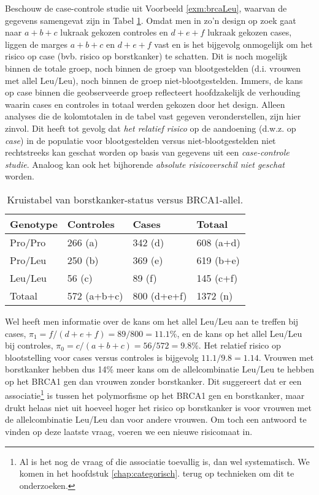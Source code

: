 \documentclass[
  12pt,dutch,coursenotes]{book}
\theoremstyle{definition}
\theoremstyle{definition}
\theoremstyle{definition}
\theoremstyle{remark}
\begin{document}
Beschouw de case-controle studie uit Voorbeeld \ref{exm:brcaLeu}, waarvan
de gegevens samengevat zijn in Tabel \ref{tab:leu2}. Omdat men in
zo'n design op zoek gaat naar \(a+b+c\) lukraak gekozen controles en \(d+e+f\) lukraak
gekozen cases, liggen de marges \(a+b+c\) en \(d+e+f\) vast en is het bijgevolg
onmogelijk om het risico op case (bvb. risico op borstkanker) te schatten. Dit is noch mogelijk binnen de
totale groep, noch binnen de groep van blootgestelden (d.i. vrouwen met allel Leu/Leu), noch binnen de groep
niet-blootgestelden. Immers, de kans op case binnen die geobserveerde groep reflecteert hoofdzakelijk de verhouding waarin cases en controles in totaal werden gekozen door het design. Alleen analyses die de kolomtotalen
in de tabel vast gegeven veronderstellen, zijn hier zinvol. Dit heeft tot
gevolg dat \emph{het relatief risico} op de aandoening (d.w.z. op \emph{case})
in de populatie voor blootgestelden versus niet-blootgestelden niet
rechtstreeks kan geschat worden op basis van gegevens uit een \emph{case-controle studie}. Analoog kan ook het bijhorende \emph{absolute risicoverschil niet geschat} worden.

\begin{table}

\caption{\label{tab:leu2}Kruistabel van borstkanker-status versus BRCA1-allel.}
\centering
\begin{tabular}[t]{llll}
\toprule
Genotype & Controles & Cases & Totaal\\
\midrule
Pro/Pro & 266 (a) & 342 (d) & 608 (a+d)\\
Pro/Leu & 250 (b) & 369 (e) & 619 (b+e)\\
Leu/Leu & 56 (c) & 89 (f) & 145 (c+f)\\
Totaal & 572 (a+b+c) & 800 (d+e+f) & 1372 (n)\\
\bottomrule
\end{tabular}
\end{table}

Wel heeft men informatie over de kans om het allel Leu/Leu aan te treffen bij cases, \(\pi_1=f/(d+e+f)=89/800=11.1\%\), en de kans op het allel Leu/Leu bij controles, \(\pi_0=c/(a+b+c)=56/572=9.8\%\). Het relatief risico op blootstelling voor cases versus
controles is bijgevolg \(11.1/9.8=1.14\). Vrouwen met borstkanker hebben dus
14\% meer kans om de allelcombinatie Leu/Leu te hebben op het BRCA1 gen dan vrouwen zonder borstkanker.
Dit suggereert dat er
een associatie\footnote{Al is het nog de vraag of die associatie toevallig is, dan wel systematisch. We komen in het hoofdstuk \ref{chap:categorisch}. terug op technieken om dit te onderzoeken.} is tussen het polymorfisme op het BRCA1 gen en borstkanker, maar drukt helaas niet uit hoeveel hoger het risico op borstkanker is voor vrouwen met de allelcombinatie Leu/Leu dan voor andere vrouwen. Om toch een antwoord te vinden op deze laatste vraag, voeren we een nieuwe risicomaat in.
\end{document}
